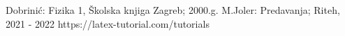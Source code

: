 
%



\begin{thebibliography}{99}
%
 Dobrinić: Fizika 1, Školska knjiga Zagreb; 2000.g.
%
 M.Joler: Predavanja; Riteh, 2021 - 2022
%
  https://latex-tutorial.com/tutorials

\end{thebibliography}
